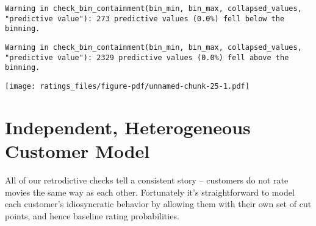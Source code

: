 \documentclass[
  letterpaper,
  DIV=11,
  numbers=noendperiod]{scrartcl}
\begin{document}
\begin{verbatim}
Warning in check_bin_containment(bin_min, bin_max, collapsed_values,
"predictive value"): 273 predictive values (0.0%) fell below the binning.
\end{verbatim}

\begin{verbatim}
Warning in check_bin_containment(bin_min, bin_max, collapsed_values,
"predictive value"): 2329 predictive values (0.0%) fell above the binning.
\end{verbatim}

\texttt{[image: ratings\_files/figure-pdf/unnamed-chunk-25-1.pdf]}

\section{Independent, Heterogeneous Customer
Model}\label{independent-heterogeneous-customer-model}

All of our retrodictive checks tell a consistent story -- customers do
not rate movies the same way as each other. Fortunately it's
straightforward to model each customer's idiosyncratic behavior by
allowing them with their own set of cut points, and hence baseline
rating probabilities.
\end{document}
